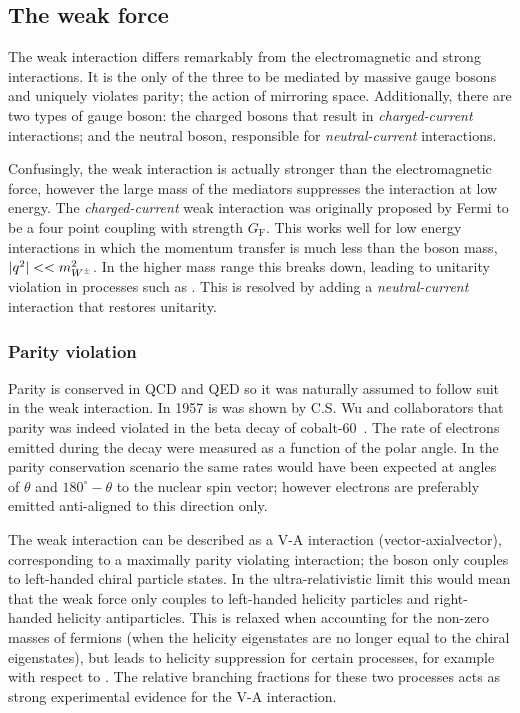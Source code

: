 \subsection{The weak force}

The weak interaction differs remarkably from the electromagnetic and strong interactions. It is the only of the three to be mediated by massive gauge bosons and uniquely violates parity; the action of mirroring space. 
Additionally, there are two types of gauge boson: the charged \Wpm bosons that result in \emph{charged-current} interactions; and the neutral \Z boson, responsible for \emph{neutral-current} interactions. 

Confusingly, the weak interaction is actually stronger than the electromagnetic force, however the large mass of the mediators suppresses the interaction at low energy.
The \emph{charged-current} weak interaction was originally proposed by Fermi to be a four point coupling with strength $G_{\text{F}}$. 
This works well for low energy interactions in which the momentum transfer is much less than the \Wpm boson mass, $|q^{2}|<<m_{W^\pm}^2$. In the higher mass range this breaks down, leading to unitarity violation in processes such as \decay{\ep\en}{\Wp\Wm}. This is resolved by adding a \emph{neutral-current} interaction that restores unitarity. 


\subsubsection{Parity violation}
Parity is conserved in QCD and QED so it was naturally assumed to follow suit in the weak interaction. In 1957 is was shown by C.S. Wu and collaborators that parity was indeed violated in the beta decay of cobalt-60~\cite{PhysRev.105.1413}. The rate of electrons emitted during the decay were measured as a function of the polar angle. In the parity conservation scenario the same rates would have been expected at angles of $\theta$ and $180^\circ-\theta$ to the nuclear spin vector; however electrons are preferably emitted anti-aligned to this direction only.          

The weak interaction can be described as a V-A interaction (vector-axialvector), corresponding to a maximally parity violating interaction; the \Wpm boson only couples to left-handed chiral particle states. In the ultra-relativistic limit this would mean that the weak force only couples to left-handed helicity particles and right-handed helicity antiparticles. This is relaxed when accounting for the non-zero masses of fermions (when the helicity eigenstates are no longer equal to the chiral eigenstates), but leads to helicity suppression for certain processes, for example \decay{\pim}{\en\neueb} with respect to \decay{\pim}{\mun\neumb}. The relative branching fractions for these two processes acts as strong experimental evidence for the V-A interaction.

